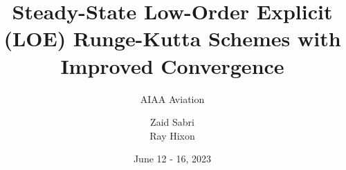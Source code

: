 \title{Steady-State Low-Order Explicit (LOE) Runge-Kutta Schemes with Improved Convergence}
\subtitle{AIAA Aviation}
\author[Z. Sabri, R. Hixon]{Zaid Sabri \\ Ray Hixon}


\date{June 12 - 16, 2023}